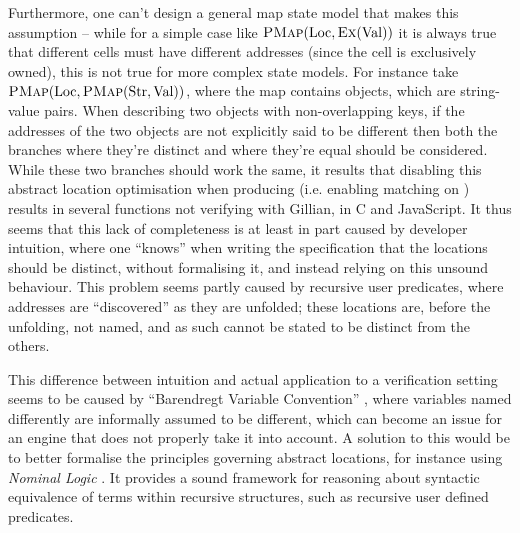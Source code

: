 Furthermore, one can't design a general map state model that makes this assumption -- while for a simple case like $\textsc{PMap}(\text{Loc}, \textsc{Ex}(\text{Val}))$ it is always true that different cells must have different addresses (since the cell is exclusively owned), this is not true for more complex state models. For instance take $\textsc{PMap}(\text{Loc}, \textsc{PMap}(\text{Str}, \text{Val}))$, where the map contains objects, which are string-value pairs. When describing two objects with non-overlapping keys, if the addresses of the two objects are not explicitly said to be different then both the branches where they're distinct and where they're equal should be considered. While these two branches should work the same, it results that disabling this abstract location optimisation when producing (i.e. enabling matching on \produce) results in several functions not verifying with Gillian, in C and JavaScript. It thus seems that this lack of completeness is at least in part caused by developer intuition, where one ``knows'' when writing the specification that the locations should be distinct, without formalising it, and instead relying on this unsound behaviour. This problem seems partly caused by recursive user predicates, where addresses are ``discovered'' as they are unfolded; these locations are, before the unfolding, not named, and as such cannot be stated to be distinct from the others.

This difference between intuition and actual application to a verification setting seems to be caused by ``Barendregt Variable Convention'' \cite{formalbarendregt}, where variables named differently are informally assumed to be different, which can become an issue for an engine that does not properly take it into account. A solution to this would be to better formalise the principles governing abstract locations, for instance using \emph{Nominal Logic} \cite{nominallogic,formalbarendregt}. It provides a sound framework for reasoning about syntactic equivalence of terms within recursive structures, such as recursive user defined predicates.

